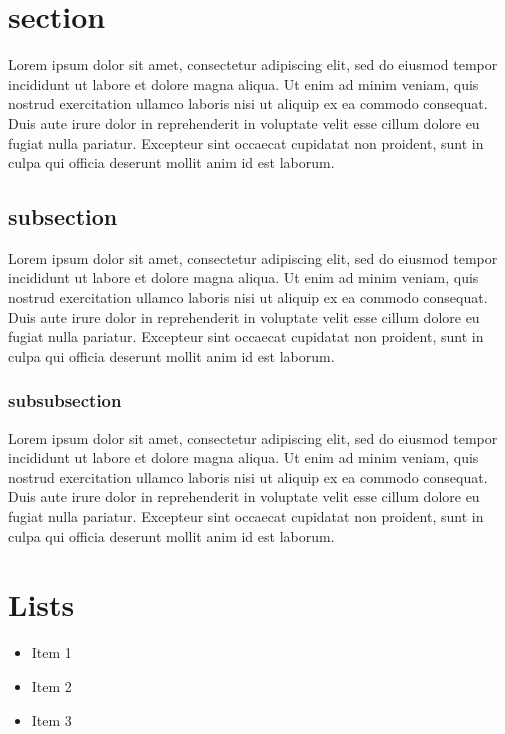 \documentclass[12pt]{article}
\begin{document}
    \newpage

    \section{section}
    Lorem ipsum dolor sit amet, consectetur adipiscing elit, sed do eiusmod tempor incididunt ut labore et dolore magna aliqua. Ut enim ad minim veniam, quis nostrud exercitation ullamco laboris nisi ut aliquip ex ea commodo consequat. Duis aute irure dolor in reprehenderit in voluptate velit esse cillum dolore eu fugiat nulla pariatur. Excepteur sint occaecat cupidatat non proident, sunt in culpa qui officia deserunt mollit anim id est laborum.

    \subsection{subsection}
    Lorem ipsum dolor sit amet, consectetur adipiscing elit, sed do eiusmod tempor incididunt ut labore et dolore magna aliqua. Ut enim ad minim veniam, quis nostrud exercitation ullamco laboris nisi ut aliquip ex ea commodo consequat. Duis aute irure dolor in reprehenderit in voluptate velit esse cillum dolore eu fugiat nulla pariatur. Excepteur sint occaecat cupidatat non proident, sunt in culpa qui officia deserunt mollit anim id est laborum.
    
    \subsubsection{subsubsection}
    Lorem ipsum dolor sit amet, consectetur adipiscing elit, sed do eiusmod tempor incididunt ut labore et dolore magna aliqua. Ut enim ad minim veniam, quis nostrud exercitation ullamco laboris nisi ut aliquip ex ea commodo consequat. Duis aute irure dolor in reprehenderit in voluptate velit esse cillum dolore eu fugiat nulla pariatur. Excepteur sint occaecat cupidatat non proident, sunt in culpa qui officia deserunt mollit anim id est laborum.
    
    \section{Lists}
    
    \begin{itemize}
        \item Item 1
        \item Item 2
        \item Item 3
    \end{itemize}
    
\end{document}

